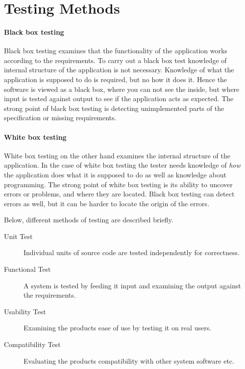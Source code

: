 \section{Testing Methods}

\paragraph{Black box testing} \cite{whiteblacboxtesting}

Black box testing examines that the functionality of the application works according to the requirements. To carry out a black box test knowledge of internal structure of the application is not necessary. Knowledge of what the application is supposed to do is required, but no how it does it. Hence the software is viewed as a black box, where you can not see the inside, but where input is tested against output to see if the application acts as expected. The strong point of black box testing is detecting unimplemented parts of the specification or missing requirements. 

\paragraph{White box testing} \cite{whiteblacboxtesting}

White box testing on the other hand examines the internal structure of the application. In the case of white box testing the tester needs knowledge of \emph{how} the application does what it is supposed to do as well as knowledge about programming. The strong point of white box testing is its ability to uncover errors or problems, and where they are located. Black box testing can detect errors as well, but it can be harder to locate the origin of the errors.

Below, different methods of testing are described briefly.

\begin{description}
  \item[Unit Test] Individual units of source code are tested independently for correctness. \cite{unitTesting}
  \item[Functional Test] A system is tested by feeding it input and examining the output against the requirements. \cite{functionalTesting}
  \item[Usability Test] Examining the products ease of use by testing it on real users. \cite{usabilityTesting}
  \item[Compatibility Test] Evaluating the products compatibility with other system software etc. \cite{compatibilityTesting}
\end{description}